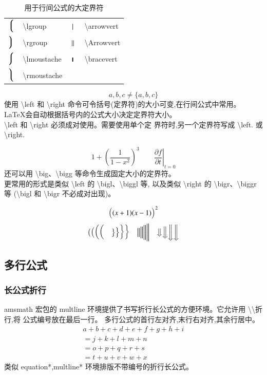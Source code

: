 \documentclass[a4paper]{ctexart}
\begin{document}
    \begin{table}[H]
        \centering
        \caption{用于行间公式的大定界符}
        \begin{tabular}{clcl}
            \toprule
            $\left\lgroup\right.$           & \textbackslash lgroup         & 
            $\left\arrowvert\right.$        & \textbackslash arrowvert      \\
            $\left\rgroup\right.$           & \textbackslash rgroup         &
            $\left\Arrowvert\right.$        & \textbackslash Arrowvert      \\ 
            $\left\lmoustache\right.$       & \textbackslash lmoustache     &
            $\left\bracevert\right.$        & \textbackslash bracevert      \\
            $\left\rmoustache\right.$       & \textbackslash rmoustache     \\
            \bottomrule
        \end{tabular}
    \end{table}
    \[ {a,b,c} \neq \{a,b,c\} \]
    使用 \textbackslash left 和 \textbackslash right 命令可令括号(定界符)的大小可变,在行间公式中常用。%
    \LaTeX 会自动根据括号内的公式大小决定定界符大小。\\
    \textbackslash left 和 \textbackslash right 必须成对使用。需要使用单个定 界符时,另一个定界符写成%
    \textbackslash left. 或 \textbackslash right.\par
    \[
        1 + \left( \frac{1}{1 - x^2} \right)^3  \qquad
        \left.\frac{\partial f}{\partial t} \right|_{t = 0} 
    \]
    还可以用 \textbackslash big、\textbackslash bigg 等命令生成固定大小的定界符。\\
    更常用的形式是类似 \textbackslash left 的 \textbackslash bigl、\textbackslash biggl 等,%
    以及类似 \textbackslash right 的 \textbackslash bigr、\textbackslash biggr 等%
    (\textbackslash bigl 和 \textbackslash bigr 不必成对出现)。\par
    \[ \Bigl((x + 1)(x - 1)\Bigr)^2 \]
    \[  \bigl( \Bigl( \biggl( \Biggl( \quad 
        \bigr\} \Bigr\} \biggr\} \Biggr\} \quad
        \big\| \Big\| \bigg\| \Bigg\| \quad
        \big\Downarrow \Big\Downarrow
        \bigg\Downarrow \Bigg\Downarrow
    \]
    \subsection{多行公式}
    \subsubsection{长公式折行}
    amsmath 宏包的 multline 环境提供了书写折行长公式的方便环境。它允许用 %
    \textbackslash\textbackslash 折行,将 公式编号放在最后一行。%
    多行公式的首行左对齐,末行右对齐,其余行居中。
    \begin{multline}
        a + b + c + d + e + f + g + h + i\\
        = j + k + l + m + n\\
        = o + p + q + r + s\\
        = t + u + v + w + x
    \end{multline}
    类似 equation*,multline* 环境排版不带编号的折行长公式。
\end{document}
